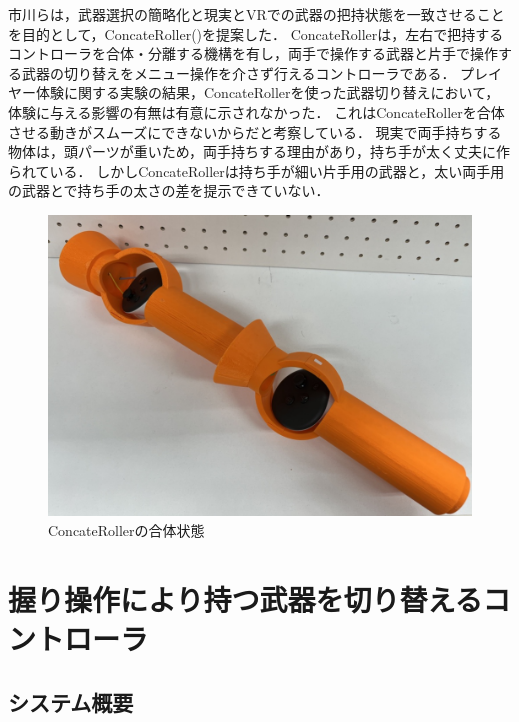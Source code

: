 \documentclass[uplatex]{jsarticle}
\begin{document}
市川らは，武器選択の簡略化と現実とVRでの武器の把持状態を一致させることを目的として，ConcateRoller()を提案した\cite{市川2025ConcateRoller}．
ConcateRollerは，左右で把持するコントローラを合体・分離する機構を有し，両手で操作する武器と片手で操作する武器の切り替えをメニュー操作を介さず行えるコントローラである．
プレイヤー体験に関する実験の結果，ConcateRollerを使った武器切り替えにおいて，体験に与える影響の有無は有意に示されなかった．
これはConcateRollerを合体させる動きがスムーズにできないからだと考察している．
現実で両手持ちする物体は，頭パーツが重いため，両手持ちする理由があり，持ち手が太く丈夫に作られている．
しかしConcateRollerは持ち手が細い片手用の武器と，太い両手用の武器とで持ち手の太さの差を提示できていない．

\begin{figure}[htbp]
    \centering
    \includegraphics[width=0.9\linewidth]{fig/ConcateRoller合体.png}
    \caption{ConcateRollerの合体状態}
    \label{fig:ConcateRoller_concate}
\end{figure}

\section{握り操作により持つ武器を切り替えるコントローラ}

\subsection{システム概要}
\end{document}
